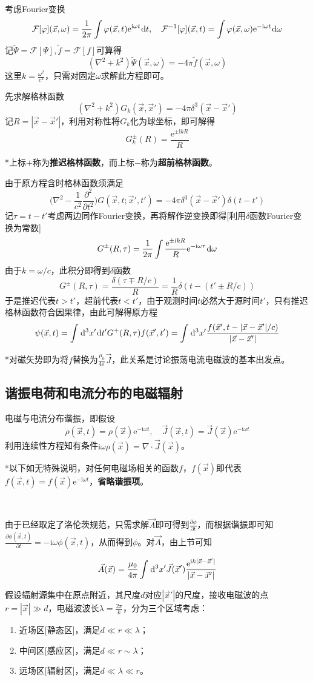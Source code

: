 \documentclass[a4paper,UTF8,fontset=windows]{ctexart}
\newcommand*{\dr}{\hspace{0.07em}\mathrm{d}}
\newcommand*{\er}{\mathrm{e}}
\newcommand*{\ir}{\mathrm{i}}
\newcommand*{\va}{\vec{A}}
\newcommand*{\vj}{\vec{J}}
\newcommand*{\vx}{\vec{x}}
\newcommand*{\pt}[2][t]{\frac{\partial #2}{\partial #1}}
\newcommand*{\ppt}[2][t^2]{\frac{\partial^2 #2}{\partial #1}}
\begin{document}
考虑Fourier变换
$$\mathcal{F}[\varphi](\vx,\omega)=\frac{1}{2\pi}\int\varphi(\vx,t)\er^{\ir\omega t}\dr t,\quad\mathcal{F}^{-1}[\varphi](\vx,t)=\int\varphi(\vx,\omega)\er^{-\ir\omega t}\dr\omega$$
记$\tilde{\Psi}=\mathcal{F}[\Psi],\tilde{f}=\mathcal{F}[f]$可算得
$$(\nabla^2+k^2)\tilde{\Psi}(\vx,\omega)=-4\pi\tilde{f}(\vx,\omega)$$
这里$k=\frac{\omega^2}{c^2}$，只需对固定$\omega$求解此方程即可。

先求解格林函数
$$(\nabla^2+k^2)G_k(\vx,\vx')=-4\pi\delta^3(\vx-\vx')$$
记$R=|\vx-\vx'|$，利用对称性将$G_k$化为球坐标，即可解得
$$G_k^\pm(R)=\frac{\er^{\pm\ir kR}}{R}$$

*上标$+$称为\textbf{推迟格林函数}，而上标$-$称为\textbf{超前格林函数}。

由于原方程含时格林函数须满足
$$\bigg(\nabla^2-\frac{1}{c^2}\ppt{}\bigg)G(\vx,t;\vx',t')=-4\pi\delta^3(\vx-\vx')\delta(t-t')$$
记$\tau=t-t'$考虑两边同作Fourier变换，再将解作逆变换即得[利用$\delta$函数Fourier变换为常数]
$$G^\pm(R,\tau)=\frac{1}{2\pi}\int\frac{\er^{\pm\ir kR}}{R}\er^{-\ir\omega\tau}\dr\omega$$
由于$k=\omega/c$，此积分即得到$\delta$函数
$$G^{\pm}(R,\tau)=\frac{\delta(\tau\mp R/c)}{R}=\frac{1}{R}\delta(t-(t'\pm R/c))$$
于是推迟代表$t>t'$，超前代表$t<t'$，由于观测时间$t$必然大于源时间$t'$，只有推迟格林函数符合因果律，由此可解得原方程
$$\psi(\vx,t)=\int\dr^3x'\dr t'G^+(R,\tau)f(\vx',t')=\int\dr^3x'\frac{f(\vx',t-|\vx-\vx'|/c)}{|\vx-\vx'|}$$

*对磁矢势即为将$f$替换为$\frac{\mu_0}{4\pi}\vj$，此关系是讨论振荡电流电磁波的基本出发点。

\subsection{谐振电荷和电流分布的电磁辐射}
电磁与电流分布谐振，即假设
$$\rho(\vx,t)=\rho(\vx)\er^{-\ir\omega t},\quad\vj(\vx,t)=\vj(\vx)\er^{-\ir\omega t}$$
利用连续性方程知有条件$\ir\omega\rho(\vx)=\nabla\cdot\vj(\vx)$。

*以下如无特殊说明，对任何电磁场相关的函数$f$，$f(\vx)$即代表$f(\vx,t)=f(\vx)\er^{-\ir\omega t}$，\textbf{省略谐振项}。

\

由于已经取定了洛伦茨规范，只需求解$\va$即可得到$\pt{\phi}$，而根据谐振即可知$\pt{\phi(\vx,t)}=-\ir\omega\phi(\vx,t)$，从而得到$\phi$。对$\va$，由上节可知

$$\va(\vx)=\frac{\mu_0}{4\pi}\int\dr^3x'\vj(\vx')\frac{\er^{\ir k|\vx-\vx'|}}{|\vx-\vx'|}$$

假设辐射源集中在原点附近，其尺度$d$对应$|\vx'|$的尺度，接收电磁波的点$r=|\vx|\gg d$，电磁波波长$\lambda=\frac{2\pi}{k}$，分为三个区域考虑：
\begin{enumerate}
    \item 近场区[静态区]，满足$d\ll r\ll\lambda$；
    \item 中间区[感应区]，满足$d\ll r\sim\lambda$；
    \item 远场区[辐射区]，满足$d\ll\lambda\ll r$。
\end{enumerate}
\end{document}

